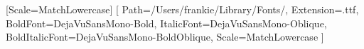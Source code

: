 \newfontface{}[Scale=MatchLowercase]
\setmonofont{DejaVuSansMono}[
  Path=/Users/frankie/Library/Fonts/,
  Extension=.ttf,
  BoldFont=DejaVuSansMono-Bold,
  ItalicFont=DejaVuSansMono-Oblique,
  BoldItalicFont=DejaVuSansMono-BoldOblique,
  Scale=MatchLowercase
]

